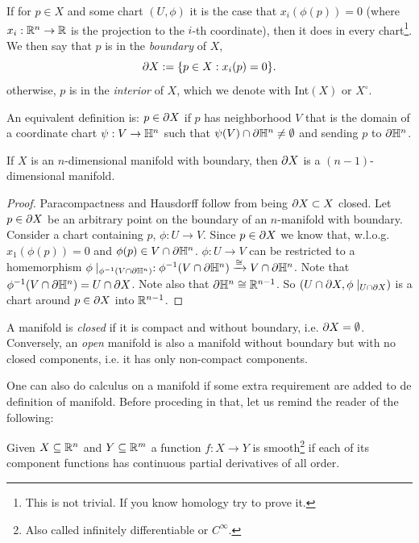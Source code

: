 \begin{defn}
    If for $p \in X$ and some chart $(U, \phi)$ it is the case that $x_i(\phi (p) )= 0$ (where $x_i:\mathbb{R}^n\to\mathbb{R}$ is the projection to the $i$-th coordinate), then it does in every chart\footnote{This is not trivial. If you know homology try to prove it.}. We then say that $p$ is in the \textit{boundary} of $X$, 
    $$
        \partial X := \{ p \in X : x_i(p) = 0\}.
    $$
    otherwise, $p$ is in the \textit{interior} of $X$, which we denote with Int$(X)$ or $X^\circ$. 

    \noindent An equivalent definition is: $p \in \partial X$ if $p$ has neighborhood $V$ that is the domain of a coordinate chart $\psi:V\to\mathbb{H}^n$ such that $\psi(V)\cap\partial\mathbb{H}^n\neq\emptyset$ and sending $p$ to $\partial \mathbb{H}^n$.
\end{defn}


\begin{lem}
    If $X$ is an $n$-dimensional manifold with boundary, then $\partial X$ is a $(n-1)$-dimensional manifold.
\end{lem}
\begin{proof}
    Paracompactness and Hausdorff follow from being $\partial X\subset X$ closed. Let $p\in\partial X$ be an arbitrary point on the boundary of an $n$-manifold with boundary. Consider a chart containing $p$, $\phi:U\to V$. Since $p\in\partial X$ we know that, w.l.o.g. $x_1(\phi(p))=0$ and $\phi(p)\in V\cap\partial\mathbb{H}^n$. $\phi:U\to V$ can be restricted to a homemorphism $\phi\mid_{\phi^{-1}(V\cap\partial\mathbb{H}^n)}:\phi^{-1}(V\cap\partial\mathbb{H}^n)\xrightarrow{\cong}V\cap\partial\mathbb{H}^n$. Note that $\phi^{-1}(V\cap\partial\mathbb{H}^n)=U\cap\partial X$. Note also that $\partial\mathbb{H}^n\cong\mathbb{R}^{n-1}$. So $(U\cap\partial X, \phi\mid_{U\cap\partial X})$ is a chart around $p\in\partial X$ into $\mathbb{R}^{n-1}$.
\end{proof}
\begin{defn}
    A manifold is \textit{closed} if it is compact and without boundary, i.e. $\partial X = \emptyset$. Conversely, an \textit{open} manifold is also a manifold without boundary but with no closed components, i.e. it has only non-compact components. 
\end{defn}

One can also do calculus on a manifold if some extra requirement are added to de definition of manifold. Before proceding in that, let us remind the reader of the following:
\begin{defn}
    Given $X\subseteq\mathbb{R}^n$ and $Y\subseteq\mathbb{R}^m$ a function $f:X\to Y$ is smooth\footnote{Also called infinitely differentiable or $C^\infty$.} if each of its component functions has continuous partial derivatives of all order.
\end{defn}

